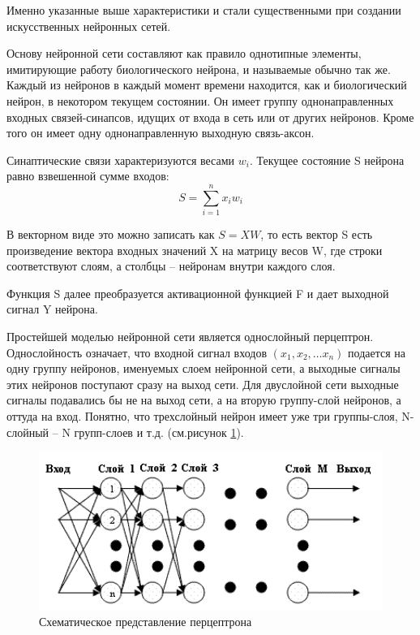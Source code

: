 \documentclass[a4paper,14pt,russian,utf8,nocolumnsxix,nocolumnxxxi,nocolumnxxxii]{eskdtext}
\begin{document}
Именно указанные выше характеристики и стали существенными при создании искусственных нейронных сетей.

Основу нейронной сети составляют как правило однотипные элементы, имитирующие работу биологического нейрона, и называемые обычно так же. Каждый из нейронов в каждый момент времени находится, как и биологический нейрон, в некотором текущем состоянии. Он имеет группу однонаправленных входных связей-синапсов, идущих от входа в сеть или от других нейронов. Кроме того он имеет одну однонаправленную выходную связь-аксон.
\pagebreak

Синаптические связи характеризуются весами $w_i$. Текущее состояние S нейрона равно взвешенной сумме входов:
\begin{equation}
S=\sum_{i=1}^{n}x_i w_i
\end{equation}

В векторном виде это можно записать как $S=XW$, то есть вектор S есть произведение вектора входных значений X на матрицу весов W, где строки соответствуют слоям, а столбцы – нейронам внутри каждого слоя.

Функция S далее преобразуется активационной функцией F и дает выходной сигнал Y нейрона.

Простейшей моделью нейронной сети является однослойный перцептрон. Однослойность означает, что входной сигнал входов $(x_1,x_2,… x_n)$ подается на одну группу нейронов, именуемых слоем нейронной сети, а выходные сигналы этих нейронов поступают сразу на выход сети. Для двуслойной сети выходные сигналы подавались бы не на выход сети, а на вторую группу-слой нейронов, а оттуда на вход. Понятно, что трехслойный нейрон имеет уже три группы-слоя, N-слойный – N групп-слоев и т.д. (см.рисунок \ref{percept}).

\begin{figure}[h!]
	\centering
	\includegraphics[width=120mm]{percept.png}
	\caption{Схематическое представление перцептрона}
	\label{percept}
\end{figure}
\end{document}

